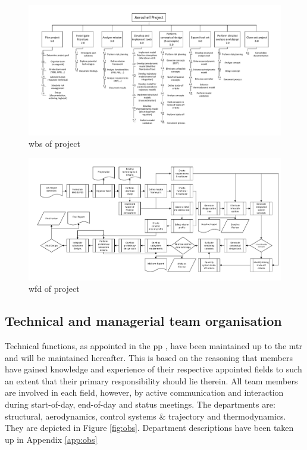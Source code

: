 \begin{figure}
    \includegraphics[scale=0.85]{Figure/WBS_MTR.pdf}
    \caption{\acrfull{wbs} of project}
    \label{fig:wbs}
\end{figure}
\begin{figure}
    \includegraphics[scale=0.85]{Figure/WFD_MTR.pdf}
    \caption{\acrfull{wfd} of project}
    \label{fig:wfd}
\end{figure}

\subsection{Technical and managerial team organisation}
\label{sec:org}
Technical functions, as appointed in the \acrfull{pp} \cite{Balasooriyan2015}, have been maintained up to the \gls{mtr} and will be maintained hereafter. This is based on the reasoning that members have gained knowledge and experience of their respective appointed fields to such an extent that their primary responsibility should lie therein. All team members are involved in each field, however, by active communication and interaction during start-of-day, end-of-day and status meetings. The departments are: structural, aerodynamics, control systems $\&$ trajectory and thermodynamics. They are depicted in Figure  \ref{fig:obs}. Department descriptions have been taken up in Appendix \ref{app:obs}

